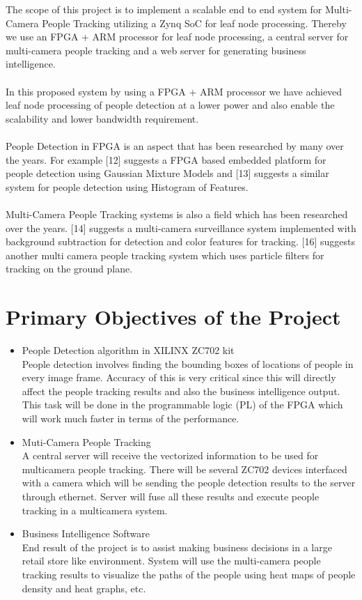 \documentclass[12pt,a4paper]{report}
\begin{document}
The scope of this project is to implement a scalable end to end system for Multi-Camera People Tracking utilizing a Zynq SoC for leaf node processing. Thereby we use an FPGA + ARM processor for leaf node processing, a central server for multi-camera people tracking and a web server for generating business intelligence.\\\\
In this proposed system by using a FPGA + ARM processor we have achieved leaf node processing of people detection at a lower power and also enable the scalability and lower bandwidth requirement. \\\\
People Detection in FPGA is an aspect that has been researched by many over the
years. For example [12] suggests a FPGA based embedded platform for people detection using Gaussian Mixture Models and [13] suggests a similar system for people detection using Histogram of Features.\\\\
Multi-Camera People Tracking systems is also a field which has been researched over the years. [14] suggests a multi-camera surveillance system implemented with background subtraction for detection and color features for tracking. [16] suggests another multi camera people tracking system which uses particle filters for tracking on the ground plane.

\section{Primary Objectives of the Project }

\begin{itemize}
\item  People Detection algorithm in XILINX ZC702 kit\\
People detection involves ﬁnding the bounding boxes of locations of people in every image frame. Accuracy of this is very critical since this will directly affect the people tracking results and also the business intelligence output. This task will be done in the programmable logic (PL) of the FPGA which will work much faster in terms of the performance. 

\item Muti-Camera People Tracking\\
A central server will receive the vectorized information to be used for multicamera people tracking. There will be several ZC702 devices interfaced with a camera which will be sending the people detection results to the server through ethernet. Server will fuse all these results and execute people tracking in a multicamera system. 

\item  Business Intelligence Software \\
End result of the project is to assist making business decisions in a large retail store like environment. System will use the multi-camera people tracking results to visualize the paths of the people using heat maps of people density and heat graphs, etc.



\end{itemize}
\newpage
\end{document}
